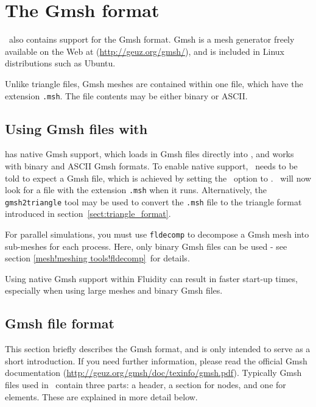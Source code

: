 \section{The Gmsh format}\label{sect:gmsh_format}


\fluidity\ also contains  support for the Gmsh format. Gmsh is a mesh
generator freely available on the Web at (\url{http://geuz.org/gmsh/}), and 
is included in Linux distributions such as Ubuntu. 

Unlike triangle files, Gmsh meshes are contained within one file, which have
the extension \lstinline[language=bash]+.msh+. The file contents may
be either binary or ASCII.

\subsection{Using Gmsh files with \fluidity}\label{sect:using_gmsh}

\fluidity has native Gmsh support, which loads in Gmsh files directly into
\fluidity, and works with binary and ASCII Gmsh formats. To enable native 
support, \fluidity\ needs to be told to expect a Gmsh file, which is achieved 
by setting the \onlypdf{}\ option 
to \onlypdf{}.  \fluidity\ will now look for a file with the extension 
\lstinline[language=bash]+.msh+ when it runs.
Alternatively, the \lstinline[language=Bash]{gmsh2triangle} tool may be used 
to convert the \lstinline[language=bash]+.msh+ file to the triangle format 
introduced in section~\ref{sect:triangle_format}.


For parallel simulations, you must use \lstinline[language=bash]+fldecomp+ to decompose a Gmsh
mesh into sub-meshes for each process. Here, only binary Gmsh files can be
used - see section \ref{mesh!meshing tools!fldecomp}\ for details.

Using native Gmsh support within Fluidity can result in faster start-up times,
especially when using large meshes and binary Gmsh files. 

\subsection{Gmsh file format}\label{sect:gmsh_file_format}

This section briefly describes the Gmsh format, and is only intended
to serve as a short introduction. If you need further
information, please read the official Gmsh documentation
(\url{http://geuz.org/gmsh/doc/texinfo/gmsh.pdf}).
Typically Gmsh files used in \fluidity\ contain three parts: a header, a
section for nodes, and one for elements. These  are explained in more
detail below.



